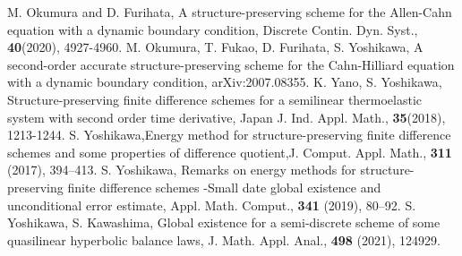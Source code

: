 \documentclass[dvipdfmx-if-dvi,autodetect-engine,ja=standard]{amsart}
\numberwithin{equation}{section} %
\begin{document}
\begin{thebibliography}{9}
     M. Okumura and D. Furihata, A structure-preserving scheme for the Allen-Cahn equation with a dynamic boundary condition, Discrete Contin. Dyn. Syst., \textbf{40}(2020), 4927-4960.
    M. Okumura, T. Fukao, D. Furihata, S. Yoshikawa, \textrm{A second-order accurate structure-preserving scheme for the Cahn-Hilliard equation with a dynamic boundary condition},  arXiv:2007.08355.
    K. Yano, S. Yoshikawa, 
    \textrm{Structure-preserving finite difference schemes for a semilinear thermoelastic system with second order time derivative}, Japan J. Ind. Appl. Math., \textbf{35}(2018), 1213-1244.  
   S. Yoshikawa,\textrm{Energy method for structure-preserving finite difference schemes and some properties of difference quotient},J. Comput. Appl. Math., \textbf{311} (2017), 394--413.
   S. Yoshikawa, Remarks on energy methods for structure-preserving finite difference schemes -Small date global existence and unconditional error estimate, Appl. Math. Comput., \textbf{341} (2019), 80--92.
 S. Yoshikawa, S. Kawashima, \textrm{Global existence for a semi-discrete scheme of some quasilinear hyperbolic balance laws}, J. Math. Appl. Anal., \textbf{498} (2021), 124929. 
\end{thebibliography}
\end{document}
